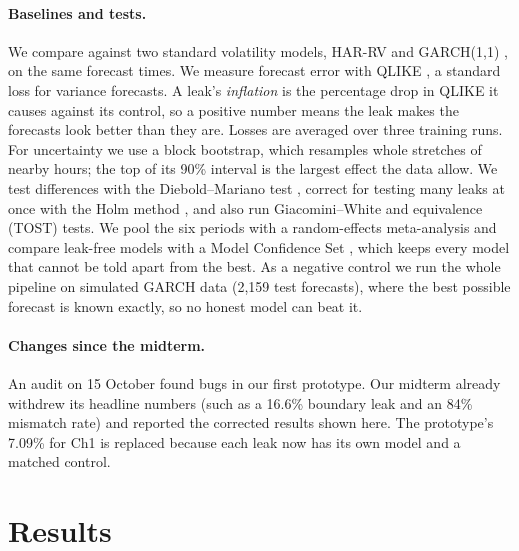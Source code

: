 \documentclass{article}
\begin{document}
\paragraph{Baselines and tests.}
We compare against two standard volatility models, HAR-RV \citep{corsi2009har} and GARCH(1,1)
\citep{bollerslev1986garch}, on the same forecast times. We measure forecast error with QLIKE
\citep{patton2011volatility}, a standard loss for variance forecasts. A leak's \emph{inflation} is the
percentage drop in QLIKE it causes against its control, so a positive number means the leak makes the
forecasts look better than they are. Losses are averaged over three training runs. For uncertainty we
use a block bootstrap, which resamples whole stretches of nearby hours; the top of its 90\% interval
is the largest effect the data allow. We test differences with the Diebold--Mariano test
\citep{diebold1995comparing}, correct for testing many leaks at once with the Holm method
\citep{holm1979simple}, and also run Giacomini--White \citep{giacomini2006tests} and equivalence (TOST)
tests. We pool the six periods with a random-effects meta-analysis \citep{dersimonian1986meta} and
compare leak-free models with a Model Confidence Set \citep[MCS;][]{hansen2011mcs}, which keeps every
model that cannot be told apart from the best. As a negative control we run the whole pipeline on
simulated GARCH data (2,159 test forecasts), where the best possible forecast is known exactly, so no
honest model can beat it.

\paragraph{Changes since the midterm.}
An audit on 15 October found bugs in our first prototype. Our midterm already withdrew its headline
numbers (such as a 16.6\% boundary leak and an 84\% mismatch rate) and reported the corrected results
shown here. The prototype's 7.09\% for Ch1 is replaced because each leak now has its own model and a
matched control.

\section{Results}
\end{document}

